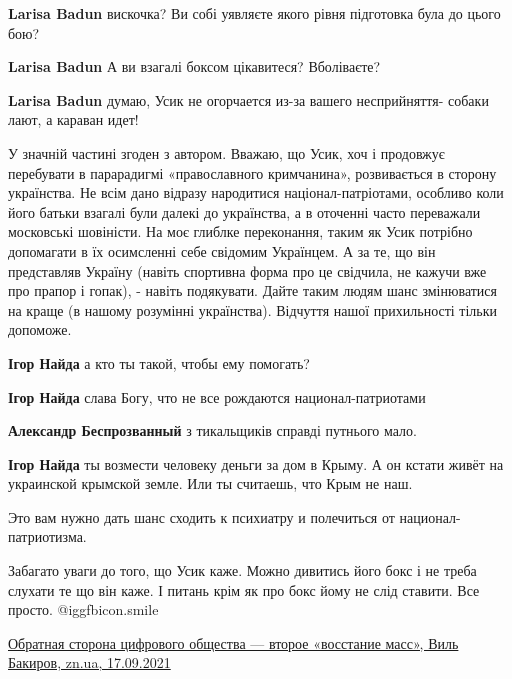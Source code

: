 \begin{itemize}
\begin{itemize} %
\textbf{Larisa Badun} вискочка? Ви собі уявляєте якого рівня підготовка була до цього бою?

\textbf{Larisa Badun} А ви взагалі боксом цікавитеся? Вболіваєте?

\textbf{Larisa Badun} думаю, Усик не огорчается из-за вашего несприйняття- собаки лают, а караван идет!
\end{itemize} %


У значній частині згоден з автором. Вважаю, що Усик, хоч і продовжує перебувати
в парарадигмі «православного кримчанина», розвивається в сторону українства. Не
всім дано відразу народитися націонал-патріотами, особливо коли його батьки
взагалі були далекі до українства, а в оточенні часто переважали московські
шовіністи. На моє глиблке переконання, таким як Усик потрібно допомагати в їх
осимсленні себе свідомим Українцем. А за те, що він представляв Україну (навіть
спортивна форма про це свідчила, не кажучи вже про прапор і гопак), - навіть
подякувати. Дайте таким людям шанс змінюватися на краще (в нашому розумінні
українства). Відчуття нашої прихильності тільки допоможе.

\begin{itemize} %
\textbf{Ігор Найда} а кто ты такой, чтобы ему помогать?

\textbf{Ігор Найда} слава Богу, что не все рождаются национал-патриотами

\textbf{Александр Беспрозванный} з тикальщиків справді путнього мало.

\textbf{Ігор Найда} ты возмести человеку деньги за дом в Крыму. А он кстати живёт на украинской крымской земле. Или ты считаешь, что Крым не наш.

Это вам нужно дать шанс сходить к психиатру и полечиться от национал- патриотизма.
\end{itemize} %


Забагато уваги до того, що Усик каже. Можно дивитись його бокс і не треба
слухати те що він каже. І питань крім як про бокс йому не слід ставити. Все
просто.  @igg{fbicon.smile} 

\href{https://zn.ua/tech/obratnaja-storona-tsifrovoho-obshchestva-vtoroe-vosstanie-mass-.html}{%
Обратная сторона цифрового общества — второе «восстание масс», Виль Бакиров, zn.ua, 17.09.2021%
}


\end{itemize}
